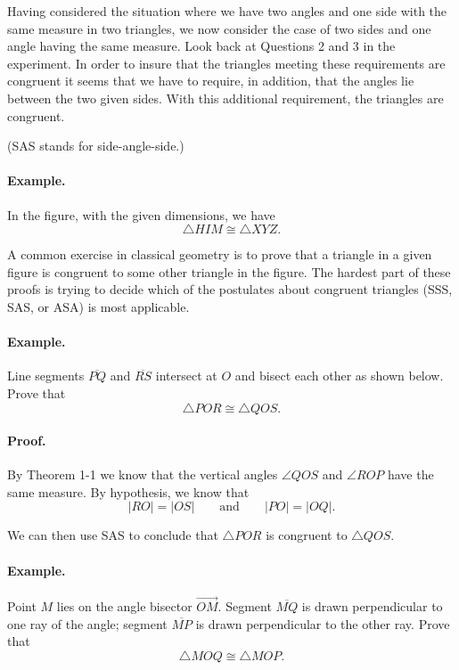 \documentclass[12pt]{book} %
\begin{document}
Having considered the situation where we have two angles and one side with the same measure in two triangles, we now consider the case of two sides and one angle having the same measure. Look back at Questions 2 and 3 in the experiment. In order to insure that the triangles meeting these requirements are congruent it seems that we have to require, in addition, that the angles lie between the two given sides. With this additional requirement, the triangles are congruent.


\noindent (SAS stands for side-angle-side.)

\paragraph{Example.}
In the figure, with the given dimensions, we have
\[
\triangle HIM\cong\triangle XYZ.
\]


A common exercise in classical geometry is to prove that a triangle in a given figure is congruent to some other triangle in the figure. The hardest part of these proofs is trying to decide which of the postulates about congruent triangles (SSS, SAS, or ASA) is most applicable.

\paragraph{Example.}
Line segments $\overline{PQ}$ and $\overline{RS}$ intersect at $O$ and bisect each other as shown below. Prove that
\[
\triangle POR\cong\triangle QOS.
\]


\paragraph{Proof.}
By Theorem 1-1 we know that the vertical angles $\angle QOS$ and $\angle ROP$ have the same measure. By hypothesis, we know that
\[
|RO|=|OS|
\qquad \text{and} \qquad
|PO|=|OQ|.
\]

We can then use SAS to conclude that $\triangle POR$ is congruent to $\triangle QOS$.

\paragraph{Example.}
Point $M$ lies on the angle bisector $\overrightarrow{OM}$. Segment $\overline{MQ}$ is drawn perpendicular to one ray of the angle; segment $\overline{MP}$ is drawn perpendicular to the other ray. Prove that
\[
\triangle MOQ\cong\triangle MOP.
\]
\end{document}
